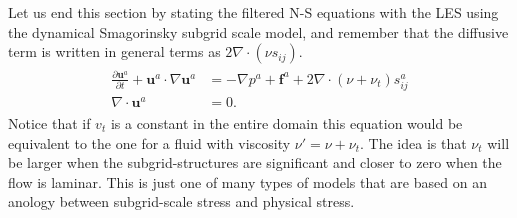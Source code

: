 Let us end this section by stating the filtered N-S equations with the LES using 
the dynamical Smagorinsky subgrid scale model, and remember that the diffusive term is written 
in general terms as $2\nabla \cdot (\nu s_{ij})$.  
%
\begin{align}
    \begin{split}
        \frac{\partial \mathbf{u}^a}{\partial t} + \mathbf{u}^a\cdot \nabla\mathbf{u}^a
        &= -\nabla p^a+\mathbf{f}^a +2\nabla \cdot (\nu + \nu_t) s^a_{ij} \\
        \nabla \cdot \mathbf{u}^a &= 0.
    \end{split}
	\label{eq:NSLES}
\end{align}
%
Notice that if $v_t$ is a constant in the entire domain this equation would 
be equivalent to the one for a fluid with viscosity $\nu'= \nu + \nu_t$. The idea is 
that $\nu_t$ will be larger when the subgrid-structures are significant and closer to zero 
when the flow is laminar. This is just one of many types of models that are based on an 
anology between subgrid-scale stress and physical stress. 



